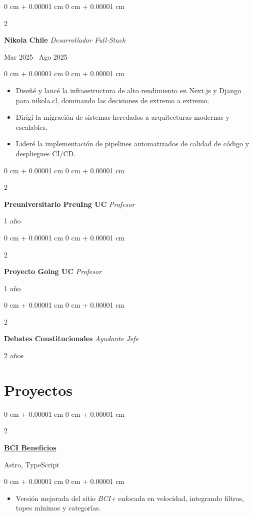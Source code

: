\documentclass[10pt, letterpaper]{article}
\newenvironment{highlights}{
    \begin{itemize}[
        topsep=0.05 cm,
        parsep=0.05 cm,
        partopsep=0pt,
        itemsep=0pt,
        leftmargin=0 cm + 10pt
    ]
}{
    \end{itemize}
} %
\newenvironment{onecolentry}{
    \begin{adjustwidth}{
        0 cm + 0.00001 cm
    }{
        0 cm + 0.00001 cm
    }
}{
    \end{adjustwidth}
} %
\newenvironment{twocolentry}[2][]{
    \onecolentry
    \def\secondColumn{#2}
    \setcolumnwidth{\fill, 4.0 cm}
    \begin{paracol}{2}
}{
    \switchcolumn \raggedleft \secondColumn
    \end{paracol}
    \endonecolentry
} %
\let\hrefWithoutArrow\href
\begin{document}
    \begin{twocolentry}{\color{gray} Mar 2025 \textendash\ Ago 2025}
        \textbf{Nikola Chile} \quad \textit{Desarrollador Full-Stack}
    \end{twocolentry}
    \vspace{0.05 cm}
    \begin{onecolentry}
        \begin{highlights}
            \item Diseñé y lancé la infraestructura de alto rendimiento en Next.js y Django para nikola.cl, dominando las decisiones de extremo a extremo.
            \item Dirigí la migración de sistemas heredados a arquitecturas modernas y escalables.
            \item Lideré la implementación de pipelines automatizados de calidad de código y despliegues CI/CD.
        \end{highlights}
    \end{onecolentry}
    \vspace{0.1 cm}

    \begin{twocolentry}{\color{gray} 1 año}
        \textbf{Preuniversitario PreuIng UC} \quad \textit{Profesor}
    \end{twocolentry}
    \vspace{0.1 cm}

    \begin{twocolentry}{\color{gray} 1 año}
        \textbf{Proyecto Going UC} \quad \textit{Profesor}
    \end{twocolentry}
    \vspace{0.1 cm}

    \begin{twocolentry}{\color{gray} 2 años}
        \textbf{Debates Constitucionales} \quad \textit{Ayudante Jefe}
    \end{twocolentry}

    \section{Proyectos}

    \begin{twocolentry}{\color{gray} Astro, TypeScript}
        \textbf{\hrefWithoutArrow{https://bcibeneficios.onrender.com/}{BCI Beneficios}}
    \end{twocolentry}
    \vspace{0.05 cm}
    \begin{onecolentry}
        \begin{highlights}
            \item Versión mejorada del sitio \textit{BCI+} enfocada en velocidad, integrando filtros, topes mínimos y categorías.
        \end{highlights}
    \end{onecolentry}
    \vspace{0.1 cm}
\end{document}
